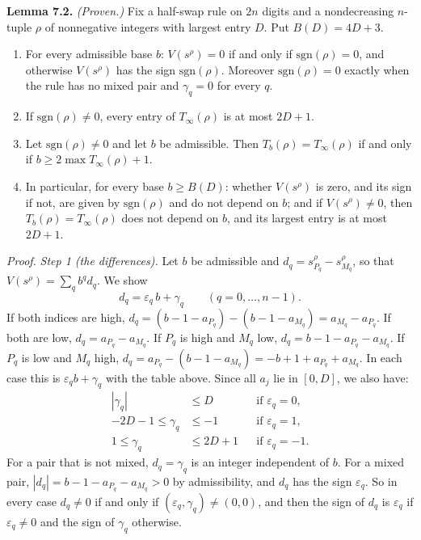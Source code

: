\documentclass[11pt,letterpaper]{article}
\theoremstyle{paperstyle}
\theoremstyle{paperstyledef}
\theoremstyle{paperstylerem}
\begin{document}
\textbf{Lemma 7.2.} \emph{(Proven.)} Fix a half-swap rule on \(2n\) digits and a nondecreasing \(n\)-tuple \(\rho\) of nonnegative integers with largest entry \(D\). Put \(B(D) = 4D + 3\).

\begin{enumerate}
\def\labelenumi{(\alph{enumi})}
\item
  For every admissible base \(b\): \(V(s^\rho) = 0\) if and only if \(\mathrm{sgn}(\rho) = 0\), and otherwise \(V(s^\rho)\) has the sign \(\mathrm{sgn}(\rho)\). Moreover \(\mathrm{sgn}(\rho) = 0\) exactly when the rule has no mixed pair and \(\gamma_q = 0\) for every \(q\).
\item
  If \(\mathrm{sgn}(\rho) \ne 0\), every entry of \(T_\infty(\rho)\) is at most \(2D + 1\).
\item
  Let \(\mathrm{sgn}(\rho) \ne 0\) and let \(b\) be admissible. Then \(T_b(\rho) = T_\infty(\rho)\) if and only if \(b \ge 2\max T_\infty(\rho) + 1\).
\item
  In particular, for every base \(b \ge B(D)\): whether \(V(s^\rho)\) is zero, and its sign if not, are given by \(\mathrm{sgn}(\rho)\) and do not depend on \(b\); and if \(V(s^\rho) \ne 0\), then \(T_b(\rho) = T_\infty(\rho)\) does not depend on \(b\), and its largest entry is at most \(2D+1\).
\end{enumerate}

\emph{Proof.} \emph{Step 1 (the differences).} Let \(b\) be admissible and \(d_q = s^\rho_{P_q} - s^\rho_{M_q}\), so that \(V(s^\rho) = \sum_q b^q d_q\). We show \[d_q = \varepsilon_q\, b + \gamma_q \qquad (q = 0, \dots, n-1).\] If both indices are high, \(d_q = (b-1-a_{P_q}) - (b-1-a_{M_q}) = a_{M_q} - a_{P_q}\). If both are low, \(d_q = a_{P_q} - a_{M_q}\). If \(P_q\) is high and \(M_q\) low, \(d_q = b - 1 - a_{P_q} - a_{M_q}\). If \(P_q\) is low and \(M_q\) high, \(d_q = a_{P_q} - (b - 1 - a_{M_q}) = -b + 1 + a_{P_q} + a_{M_q}\). In each case this is \(\varepsilon_q b + \gamma_q\) with the table above. Since all \(a_j\) lie in \([0, D]\), we also have: \[\begin{aligned}
|\gamma_q| &\le D && \text{if } \varepsilon_q = 0, \\
-2D-1 \le \gamma_q &\le -1 && \text{if } \varepsilon_q = 1, \\
1 \le \gamma_q &\le 2D+1 && \text{if } \varepsilon_q = -1.
\end{aligned} \tag{1}\] For a pair that is not mixed, \(d_q = \gamma_q\) is an integer independent of \(b\). For a mixed pair, \(|d_q| = b - 1 - a_{P_q} - a_{M_q} > 0\) by admissibility, and \(d_q\) has the sign \(\varepsilon_q\). So in every case \(d_q \ne 0\) if and only if \((\varepsilon_q, \gamma_q) \ne (0,0)\), and then the sign of \(d_q\) is \(\varepsilon_q\) if \(\varepsilon_q \ne 0\) and the sign of \(\gamma_q\) otherwise.
\end{document}
